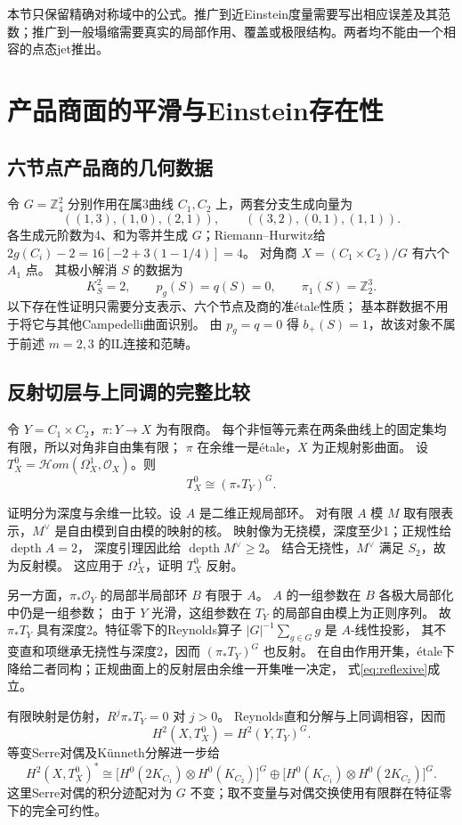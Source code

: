 \documentclass[UTF8,a4paper,11pt,fontset=fandol]{ctexart}
\numberwithin{equation}{section}
\theoremstyle{definition}
\newcommand{\Z}{\mathbb Z}
\begin{document}
本节只保留精确对称域中的公式。推广到近Einstein度量需要写出相应误差及其范数；推广到一般塌缩需要真实的局部作用、覆盖或极限结构。两者均不能由一个相容的点态jet推出。

\section{产品商面的平滑与Einstein存在性}
\subsection{六节点产品商的几何数据}
令 $G=\Z_4^2$ 分别作用在属3曲线 $C_1,C_2$ 上，两套分支生成向量为
\[
((1,3),(1,0),(2,1)),\qquad ((3,2),(0,1),(1,1)).
\]
各生成元阶数为4、和为零并生成 $G$；Riemann--Hurwitz给
$2g(C_i)-2=16[-2+3(1-1/4)]=4$。
对角商 $X=(C_1\times C_2)/G$ 有六个 $A_1$ 点。
其极小解消 $S$ 的数据为
\[
K_S^2=2,\qquad p_g(S)=q(S)=0,\qquad \pi_1(S)=\Z_2^3.
\]
以下存在性证明只需要分支表示、六个节点及商的准\'etale性质；
基本群数据不用于将它与其他Campedelli曲面识别。
由 $p_g=q=0$ 得 $b_+(S)=1$，故该对象不属于前述 $m=2,3$ 的IL连接和范畴。

\subsection{反射切层与上同调的完整比较}
令 $Y=C_1\times C_2$，$\pi:Y\to X$ 为有限商。
每个非恒等元素在两条曲线上的固定集均有限，所以对角非自由集有限；
$\pi$ 在余维一是\'etale，$X$ 为正规射影曲面。
设 $T_X^0=\mathcal Hom(\Omega_X^1,\mathcal O_X)$。则
\begin{equation}\label{eq:reflexive}
T_X^0\cong(\pi_*T_Y)^G.
\end{equation}

证明分为深度与余维一比较。设 $A$ 是二维正规局部环。
对有限 $A$ 模 $M$ 取有限表示，$M^\vee$ 是自由模到自由模的映射的核。
映射像为无挠模，深度至少1；正规性给 $\operatorname{depth}A=2$，
深度引理因此给 $\operatorname{depth}M^\vee\ge2$。
结合无挠性，$M^\vee$ 满足 $S_2$，故为反射模。
这应用于 $\Omega_X^1$，证明 $T_X^0$ 反射。

另一方面，$\pi_*\mathcal O_Y$ 的局部半局部环 $B$ 有限于 $A$。
$A$ 的一组参数在 $B$ 各极大局部化中仍是一组参数；
由于 $Y$ 光滑，这组参数在 $T_Y$ 的局部自由模上为正则序列。
故 $\pi_*T_Y$ 具有深度2。特征零下的Reynolds算子
$|G|^{-1}\sum_{g\in G}g$ 是 $A$-线性投影，
其不变直和项继承无挠性与深度2，因而 $(\pi_*T_Y)^G$ 也反射。
在自由作用开集，\'etale下降给二者同构；正规曲面上的反射层由余维一开集唯一决定，
式\eqref{eq:reflexive}成立。

有限映射是仿射，$R^j\pi_*T_Y=0$ 对 $j>0$。
Reynolds直和分解与上同调相容，因而
\[
H^2(X,T_X^0)=H^2(Y,T_Y)^G.
\]
等变Serre对偶及K\"unneth分解进一步给
\begin{equation}\label{eq:qg-obstruction}
H^2(X,T_X^0)^*\cong
\bigl[H^0(2K_{C_1})\otimes H^0(K_{C_2})\bigr]^G
\oplus
\bigl[H^0(K_{C_1})\otimes H^0(2K_{C_2})\bigr]^G.
\end{equation}
这里Serre对偶的积分迹配对为 $G$ 不变；取不变量与对偶交换使用有限群在特征零下的完全可约性。
\end{document}
